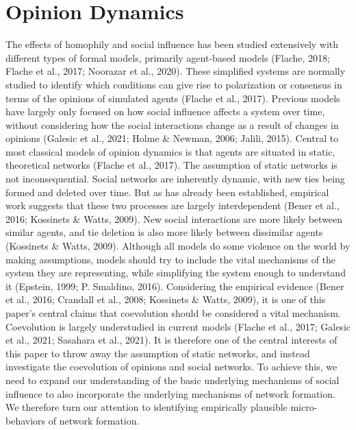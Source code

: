 \documentclass{article}
\begin{document}
\section{Opinion Dynamics}
The effects of homophily and social influence has been studied extensively with different types of formal models, primarily agent-based models (Flache, 2018; Flache et al., 2017; Noorazar et al., 2020). These simplified systems are normally studied to identify which conditions can give rise to polarization or consensus in terms of the opinions of simulated agents (Flache et al., 2017). Previous models have largely only focused on how social influence affects a system over time, without considering how the social interactions change as a result of changes in opinions (Galesic et al., 2021; Holme \& Newman, 2006; Jalili, 2015). Central to most classical models of opinion dynamics is that agents are situated in static, theoretical networks (Flache et al., 2017). The assumption of static networks is not inconsequential. Social networks are inherently dynamic, with new ties being formed and deleted over time.  But as has already been established, empirical work suggests that these two processes are largely interdependent (Bener et al., 2016; Kossinets \& Watts, 2009). New social interactions are more likely between similar agents, and tie deletion is also more likely between dissimilar agents (Kossinets \& Watts, 2009). 
Although all models do some violence on the world by making assumptions, models should try to include the vital mechanisms of the system they are representing, while simplifying the system enough to understand it (Epstein, 1999; P. Smaldino, 2016). Considering the empirical evidence (Bener et al., 2016; Crandall et al., 2008; Kossinets \& Watts, 2009), it is one of this paper’s central claims that coevolution should be considered a vital mechanism. Coevolution is largely understudied in current models (Flache et al., 2017; Galesic et al., 2021; Sasahara et al., 2021). It is therefore one of the central interests of this paper to throw away the assumption of static networks, and instead investigate the coevolution of opinions and social networks. To achieve this, we need to expand our understanding of the basic underlying mechanisms of social influence to also incorporate the underlying mechanisms of network formation. We therefore turn our attention to identifying empirically plausible micro-behaviors of network formation. 
\end{document}
